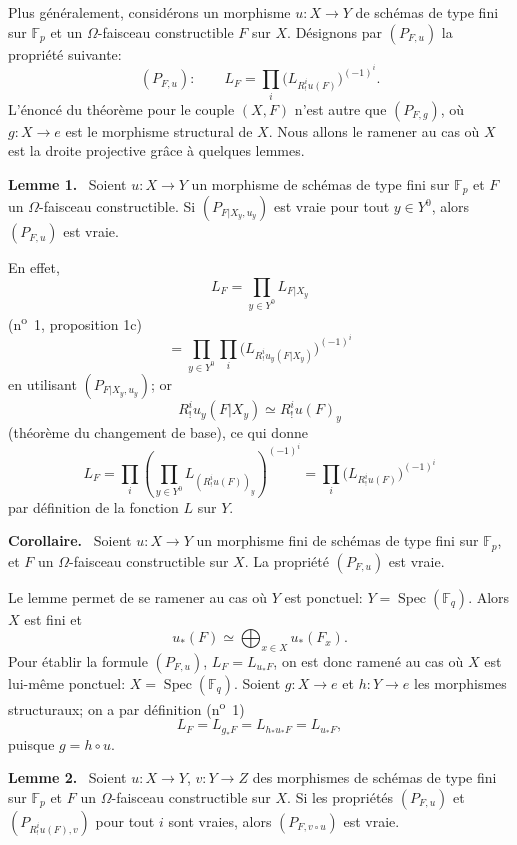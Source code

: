 \documentclass[11pt]{article}
\newenvironment{statement}[1]{\par\medskip\noindent\textbf{#1.}\ }{\par\medskip}
\DeclareMathOperator{\Spec}{Spec}
\providecommand{\Spec}{\operatorname{Spec}}
\providecommand{\Spec}{\operatorname{Spec}}
\providecommand{\Spec}{\operatorname{Spec}}
\providecommand{\Spec}{\operatorname{Spec}}
\begin{document}
Plus généralement, considérons un morphisme $u:X\to Y$ de schémas de type fini sur $\mathbb F_p$ et un $\Omega$-faisceau constructible $F$ sur $X$. Désignons par $(P_{F,u})$ la propriété suivante:
\[
(P_{F,u}):\qquad
L_F=\prod_i\bigl(L_{R^i_!u(F)}\bigr)^{(-1)^i}.
\]
L'énoncé du théorème pour le couple $(X,F)$ n'est autre que $(P_{F,g})$, où $g:X\to e$ est le morphisme structural de $X$. Nous allons le ramener au cas où $X$ est la droite projective grâce à quelques lemmes.

\begin{statement}{Lemme 1}
Soient $u:X\to Y$ un morphisme de schémas de type fini sur $\mathbb F_p$ et $F$ un $\Omega$-faisceau constructible. Si $(P_{F|X_y,u_y})$ est vraie pour tout $y\in Y^0$, alors $(P_{F,u})$ est vraie.
\end{statement}

En effet,
\[
L_F=\prod_{y\in Y^0}L_{F|X_y}
\]
(n\textsuperscript{o}~1, proposition 1c)
\[
=\prod_{y\in Y^0}\prod_i\bigl(L_{R^i_!u_y(F|X_y)}\bigr)^{(-1)^i}
\]
en utilisant $(P_{F|X_y,u_y})$; or
\[
R^i_!u_y(F|X_y)\simeq R^i_!u(F)_y
\]
(théorème du changement de base), ce qui donne
\[
L_F=\prod_i\left(\prod_{y\in Y^0}L_{(R^i_!u(F))_y}\right)^{(-1)^i}
=\prod_i\bigl(L_{R^i_!u(F)}\bigr)^{(-1)^i}
\]
par définition de la fonction $L$ sur $Y$.

\begin{statement}{Corollaire}
Soient $u:X\to Y$ un morphisme fini de schémas de type fini sur $\mathbb F_p$, et $F$ un $\Omega$-faisceau constructible sur $X$. La propriété $(P_{F,u})$ est vraie.
\end{statement}

Le lemme permet de se ramener au cas où $Y$ est ponctuel: $Y=\Spec(\mathbb F_q)$. Alors $X$ est fini et
\[
u_*(F)\simeq \bigoplus_{x\in X}u_*(F_x).
\]
Pour établir la formule $(P_{F,u})$, $L_F=L_{u_*F}$, on est donc ramené au cas où $X$ est lui-même ponctuel: $X=\Spec(\mathbb F_q)$. Soient $g:X\to e$ et $h:Y\to e$ les morphismes structuraux; on a par définition (n\textsuperscript{o}~1)
\[
L_F=L_{g_*F}=L_{h_*u_*F}=L_{u_*F},
\]
puisque $g=h\circ u$.

\begin{statement}{Lemme 2}
Soient $u:X\to Y$, $v:Y\to Z$ des morphismes de schémas de type fini sur $\mathbb F_p$ et $F$ un $\Omega$-faisceau constructible sur $X$. Si les propriétés $(P_{F,u})$ et $(P_{R^i_!u(F),v})$ pour tout $i$ sont vraies, alors $(P_{F,v\circ u})$ est vraie.
\end{statement}
\end{document}
